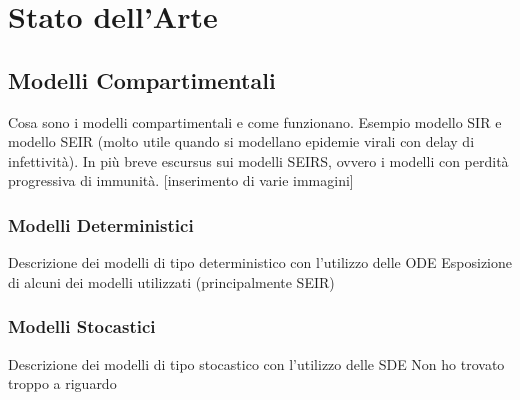 \section{Stato dell'Arte}

\subsection{Modelli Compartimentali}
Cosa sono i modelli compartimentali e come funzionano. Esempio modello SIR e modello SEIR (molto utile quando si modellano epidemie virali con delay di infettività). In più breve escursus sui modelli SEIRS, ovvero i modelli con perdità progressiva di immunità. [inserimento di varie immagini]

\subsubsection{Modelli Deterministici}
Descrizione dei modelli di tipo deterministico con l'utilizzo delle ODE
Esposizione di alcuni dei modelli utilizzati (principalmente SEIR)

\subsubsection{Modelli Stocastici}
Descrizione dei modelli di tipo stocastico con l'utilizzo delle SDE
Non ho trovato troppo a riguardo